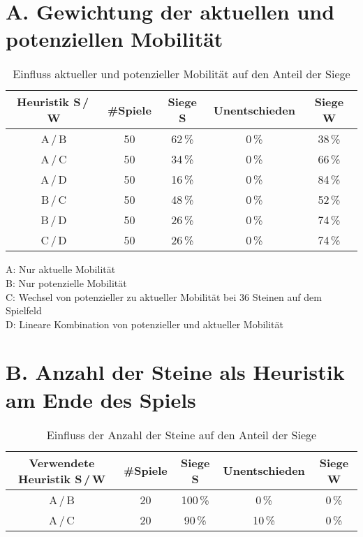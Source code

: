 
\addchap{\langanhang}

\section*{A. Gewichtung der aktuellen und potenziellen Mobilität}
 
\setcounter{table}{0}
\renewcommand{\thetable}{A\arabic{table}}

\begin{table}[hb]
\centering
\begin{tabular}{c|c|ccc}
\hline
Heuristik S\,/\,W & \#Spiele & Siege S & Unentschieden & Siege W \\
\hline
 A\,/\,B & 50 & 62\,\% &  0\,\% & 38\,\% \\
 A\,/\,C & 50 & 34\,\% &  0\,\% & 66\,\% \\
 A\,/\,D & 50 & 16\,\% &  0\,\% & 84\,\% \\
 B\,/\,C & 50 & 48\,\% &  0\,\% & 52\,\% \\
 B\,/\,D & 50 & 26\,\% &  0\,\% & 74\,\% \\
 C\,/\,D & 50 & 26\,\% &  0\,\% & 74\,\% \\
\hline
\end{tabular}
\caption{Einfluss aktueller und potenzieller Mobilität auf den Anteil der Siege}
\label{table:mobility}
\end{table}

\small{
A: Nur aktuelle Mobilität \\
B: Nur potenzielle Mobilität \\
C: Wechsel von potenzieller zu aktueller Mobilität bei 36 Steinen auf dem Spielfeld \\
D: Lineare Kombination von potenzieller und aktueller Mobilität}

\pagebreak

\section*{B. Anzahl der Steine als Heuristik am Ende des Spiels}
 
\setcounter{table}{0}
\renewcommand{\thetable}{B\arabic{table}}

\begin{table}[hb]
\centering
\begin{tabular}{c|c|ccc}
\hline
Verwendete Heuristik S\,/\,W & \#Spiele & Siege S & Unentschieden & Siege W \\
\hline
 A\,/\,B & 20 &100\,\% &  0\,\% &  0\,\% \\
 A\,/\,C & 20 & 90\,\% & 10\,\% &  0\,\% \\
\hline
\end{tabular}
\caption{Einfluss der Anzahl der Steine auf den Anteil der Siege}
\label{table:disccount}
\end{table}

